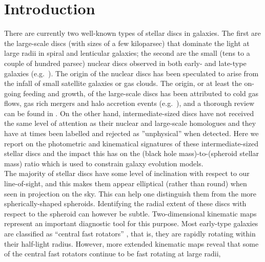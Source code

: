 \documentclass[useAMS,usenatbib,article]{mn2e}
\begin{document}
\section{Introduction}
\label{sec:int}
There are currently two well-known types of stellar discs in galaxies. 
The first are the large-scale discs (with sizes of a few kiloparsec) 
that dominate the light at large radii in spiral and lenticular galaxies; 
the second are the small (tens to a couple of hundred parsec) nuclear discs observed in both early- and late-type galaxies 
(e.g.~\citealt{scorzavandenbosch1998,rest2001,balcells2007,ledo2010}). 
The origin of the nuclear discs has been speculated to arise from the infall of small satellite galaxies or gas clouds.  
The origin, or at least the on-going feeding and growth, of the large-scale discs has been attributed to cold gas flows, 
gas rich mergers and halo accretion events 
(e.g.~\citealt{whiterees1978,khochfarsilk2006,dekel2009nat,ceverino2010,ceverino2012,conselice2012}), 
and a thorough review can be found in \citet{combes2014arX,combes2014pro}.
On the other hand, intermediate-sized discs have not received the same level of attention 
as their nuclear and large-scale homologues and 
they have at times been labelled and rejected as ''unphysical'' when detected. 
Here we report on the photometric and kinematical signatures of these intermediate-sized stellar discs 
and the impact this has on the (black hole mass)-to-(spheroid stellar mass) ratio %
which is used to constrain galaxy evolution models. \\
The majority of stellar discs have some level of inclination with respect to our line-of-sight, 
and this makes them appear elliptical (rather than round) when seen in projection on the sky. 
This can help one distinguish them from the more spherically-shaped spheroids. 
Identifying the radial extent of these discs with respect to the spheroid can however be subtle. 
Two-dimensional kinematic maps represent an important diagnostic tool for this purpose. 
Most early-type galaxies are classified as ``central fast rotators'' \citep{atlas3dIII-MNRAS}, 
that is, they are rapidly rotating within their half-light radius.  
However, more extended kinematic maps \citep{arnold2014} reveal that 
some of the central fast rotators continue to be fast rotating at large radii, 
\end{document}
